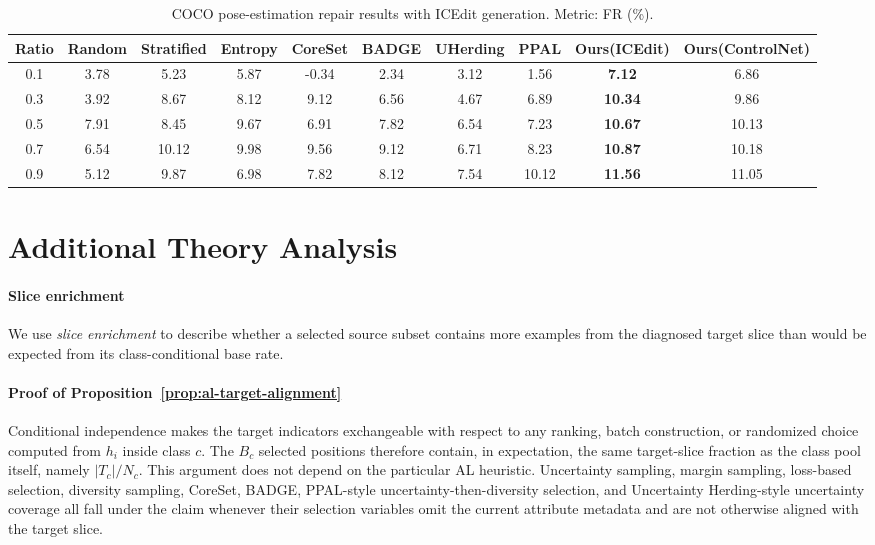 \documentclass{article}
\begin{document}
\begin{table}[h]
\centering
\caption{COCO pose-estimation repair results with ICEdit generation. Metric: FR (\%).}
\label{tab:coco-icedit-fr}
\footnotesize
\setlength{\tabcolsep}{3pt}
\begin{tabular}{c c c c c c c c c | c}
\toprule
Ratio & Random & Stratified & Entropy & CoreSet & BADGE & UHerding & PPAL & Ours(ICEdit) & Ours(ControlNet) \\
\midrule
0.1 & 3.78 & 5.23 & 5.87 & -0.34 & 2.34 & 3.12 & 1.56 & \textbf{7.12} & 6.86 \\
0.3 & 3.92 & 8.67 & 8.12 & 9.12 & 6.56 & 4.67 & 6.89 & \textbf{10.34} & 9.86 \\
0.5 & 7.91 & 8.45 & 9.67 & 6.91 & 7.82 & 6.54 & 7.23 & \textbf{10.67} & 10.13 \\
0.7 & 6.54 & 10.12 & 9.98 & 9.56 & 9.12 & 6.71 & 8.23 & \textbf{10.87} & 10.18 \\
0.9 & 5.12 & 9.87 & 6.98 & 7.82 & 8.12 & 7.54 & 10.12 & \textbf{11.56} & 11.05 \\
\bottomrule
\end{tabular}
\end{table}

\section{Additional Theory Analysis}
\label{app:theory-analysis}

\paragraph{Slice enrichment}
We use \emph{slice enrichment} to describe whether a selected source subset contains more examples from the diagnosed target slice than would be expected from its class-conditional base rate.

\paragraph{Proof of Proposition~\ref{prop:al-target-alignment}}
Conditional independence makes the target indicators exchangeable with respect to any ranking, batch construction, or randomized choice computed from $h_i$ inside class $c$. The $B_c$ selected positions therefore contain, in expectation, the same target-slice fraction as the class pool itself, namely $|T_c|/N_c$. This argument does not depend on the particular AL heuristic. Uncertainty sampling, margin sampling, loss-based selection, diversity sampling, CoreSet, BADGE, PPAL-style uncertainty-then-diversity selection, and Uncertainty Herding-style uncertainty coverage all fall under the claim whenever their selection variables omit the current attribute metadata and are not otherwise aligned with the target slice.
\end{document}
